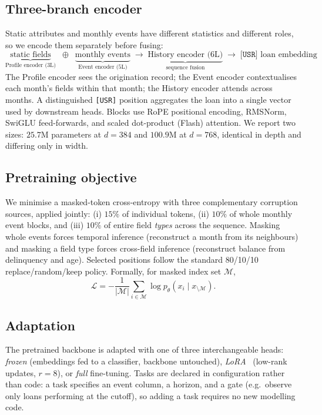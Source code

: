 \documentclass[10pt,letterpaper]{article}
\begin{document}
\subsection{Three-branch encoder}
Static attributes and monthly events have different statistics and different roles, so we encode
them separately before fusing:
\[
\underbrace{\text{static fields}}_{\text{Profile encoder (3L)}} \;\;\oplus\;\;
\underbrace{\text{monthly events}}_{\text{Event encoder (5L)}}
\;\longrightarrow\;
\underbrace{\text{History encoder (6L)}}_{\text{sequence fusion}}
\;\longrightarrow\; \texttt{[USR]} \text{ loan embedding}
\]
The Profile encoder sees the origination record; the Event encoder contextualises each month's
fields within that month; the History encoder attends across months. A distinguished
\texttt{[USR]} position aggregates the loan into a single vector used by downstream heads.
Blocks use RoPE positional encoding, RMSNorm, SwiGLU feed-forwards, and scaled dot-product
(Flash) attention. We report two sizes: $25.7$M parameters at $d{=}384$ and $100.9$M at $d{=}768$,
identical in depth and differing only in width.

\subsection{Pretraining objective}
We minimise a masked-token cross-entropy with three complementary corruption sources, applied
jointly: (i) $15\%$ of individual tokens, (ii) $10\%$ of whole monthly event blocks, and (iii)
$10\%$ of entire field \emph{types} across the sequence. Masking whole events forces temporal
inference (reconstruct a month from its neighbours) and masking a field type forces cross-field
inference (reconstruct balance from delinquency and age). Selected positions follow the standard
80/10/10 replace/random/keep policy. Formally, for masked index set $\mathcal{M}$,
\[
\mathcal{L} = -\frac{1}{|\mathcal{M}|}\sum_{i\in\mathcal{M}} \log p_\theta\!\left(x_i \mid x_{\setminus \mathcal{M}}\right).
\]

\subsection{Adaptation}
The pretrained backbone is adapted with one of three interchangeable heads: \emph{frozen}
(embeddings fed to a classifier, backbone untouched), \emph{LoRA}~\cite{hu2021lora} (low-rank
updates, $r{=}8$), or \emph{full} fine-tuning. Tasks are declared in configuration rather than
code: a task specifies an event column, a horizon, and a gate (e.g.\ observe only loans performing
at the cutoff), so adding a task requires no new modelling code.
\end{document}
